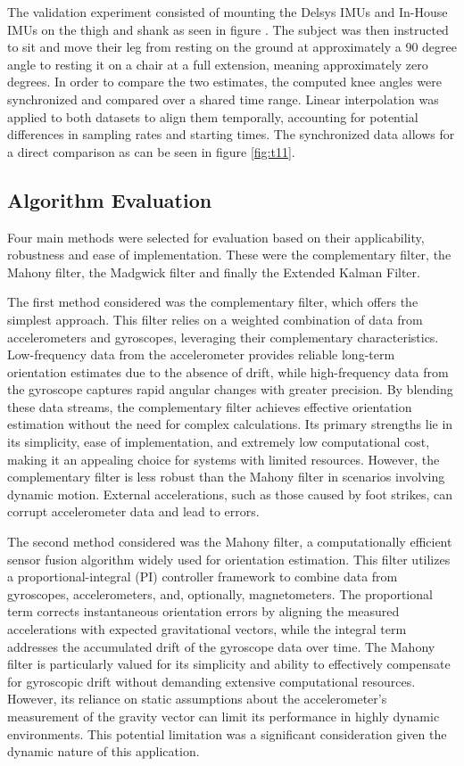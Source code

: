 The validation experiment consisted of mounting the Delsys IMUs and In-House IMUs on the thigh and shank as seen in figure . The subject was then instructed to sit and move their leg from resting on the ground at approximately a 90 degree angle to resting it on a chair at a full extension, meaning approximately zero degrees. In order to compare the two estimates, the computed knee angles were synchronized and compared over a shared time range. Linear interpolation was applied to both datasets to align them temporally, accounting for potential differences in sampling rates and starting times. The synchronized data allows for a direct comparison as can be seen in figure \ref{fig:t11}. 

\subsection{Algorithm Evaluation}
Four main methods were selected for evaluation based on their applicability, robustness and ease of implementation. These were the complementary filter, the Mahony filter, the Madgwick filter and finally the Extended Kalman Filter.

The first method considered was the complementary filter, which offers the simplest approach. This filter relies on a weighted combination of data from accelerometers and gyroscopes, leveraging their complementary characteristics. Low-frequency data from the accelerometer provides reliable long-term orientation estimates due to the absence of drift, while high-frequency data from the gyroscope captures rapid angular changes with greater precision. By blending these data streams, the complementary filter achieves effective orientation estimation without the need for complex calculations. Its primary strengths lie in its simplicity, ease of implementation, and extremely low computational cost, making it an appealing choice for systems with limited resources. However, the complementary filter is less robust than the Mahony filter in scenarios involving dynamic motion. External accelerations, such as those caused by foot strikes, can corrupt accelerometer data and lead to errors. 

The second method considered was the Mahony filter, a computationally efficient sensor fusion algorithm widely used for orientation estimation. This filter utilizes a proportional-integral (PI) controller framework to combine data from gyroscopes, accelerometers, and, optionally, magnetometers. The proportional term corrects instantaneous orientation errors by aligning the measured accelerations with expected gravitational vectors, while the integral term addresses the accumulated drift of the gyroscope data over time. The Mahony filter is particularly valued for its simplicity and ability to effectively compensate for gyroscopic drift without demanding extensive computational resources. However, its reliance on static assumptions about the accelerometer’s measurement of the gravity vector can limit its performance in highly dynamic environments. This potential limitation was a significant consideration given the dynamic nature of this application. 

